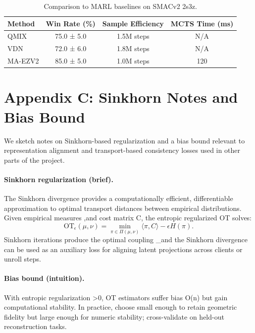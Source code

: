 \documentclass{article}
\begin{document}
\begin{table}[h]
\centering
\begin{tabular}{lccc}
\toprule
Method & Win Rate (\%) & Sample Efficiency & MCTS Time (ms) \\
\midrule
QMIX & 75.0 ± 5.0 & 1.5M steps & N/A \\
VDN & 72.0 ± 6.0 & 1.8M steps & N/A \\
MA-EZV2 & 85.0 ± 5.0 & 1.0M steps & 120 \\
\bottomrule
\end{tabular}
\caption{Comparison to MARL baselines on SMACv2 2s3z.}
\label{tab:baselines}
\end{table}

\section{Appendix C: Sinkhorn Notes and Bias Bound}
We sketch notes on Sinkhorn-based regularization and a bias bound relevant to representation alignment and transport-based consistency losses used in other parts of the project.
\paragraph{Sinkhorn regularization (brief).} The Sinkhorn divergence provides a computationally efficient, differentiable approximation to optimal transport distances between empirical distributions. Given empirical measures \mu,\nu and cost matrix C, the entropic regularized OT solves:
\[
\mathrm{OT}_\epsilon(\mu,\nu)=\min_{\pi\in\Pi(\mu,\nu)} \langle \pi, C\rangle - \epsilon H(\pi).
\]
Sinkhorn iterations produce the optimal coupling \pi_\epsilon and the Sinkhorn divergence can be used as an auxiliary loss for aligning latent projections across clients or unroll steps.
\paragraph{Bias bound (intuition).} With entropic regularization \epsilon>0, OT estimators suffer bias O(\epsilon \log n) but gain computational stability. In practice, choose \epsilon small enough to retain geometric fidelity but large enough for numeric stability; cross-validate on held-out reconstruction tasks.
\end{document}
